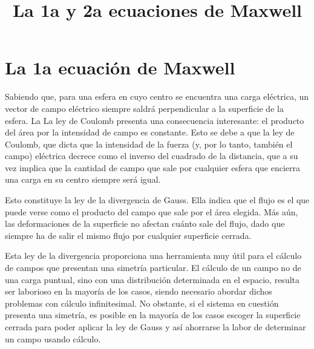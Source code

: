 \documentclass{article}
\begin{document}
\title{La 1a y 2a ecuaciones de Maxwell}
\date{}
\maketitle



\section{La 1a ecuación de Maxwell}

Sabiendo que, para una esfera en cuyo centro se encuentra una carga eléctrica, un vector de campo eléctrico siempre saldrá perpendicular a la superficie de la esfera. La La ley de Coulomb presenta una consecuencia interesante: el producto del área por la intensidad de campo es constante. Esto se debe a que la ley de Coulomb, que dicta que la intensidad de la fuerza (y, por lo tanto, también el campo) eléctrica decrece como el inverso del cuadrado de la distancia, que a su vez implica que la cantidad de campo que sale por cualquier esfera que encierra una carga en su centro siempre será igual.\bigskip

Esto constituye la ley de la divergencia de Gauss. Ella indica que el flujo es el que puede verse como el producto del campo que sale por el área elegida. Más aún, las deformaciones de la superficie no afectan cuánto sale del flujo, dado que siempre ha de salir el mismo flujo por cualquier superficie cerrada.\bigskip

Esta ley de la divergencia proporciona una herramienta muy útil para el cálculo de campos que presentan una simetría particular. El cálculo de un campo no de una carga puntual, sino con una distribución determinada en el espacio, resulta ser laborioso en la mayoría de los casos, siendo necesario abordar dichos problemas con cálculo infinitesimal. No obstante, si el sistema en cuestión presenta una simetría, es posible en la mayoría de los casos escoger la superficie cerrada para poder aplicar la ley de Gauss y así ahorrarse la labor de determinar un campo usando cálculo.\bigskip
\end{document}
